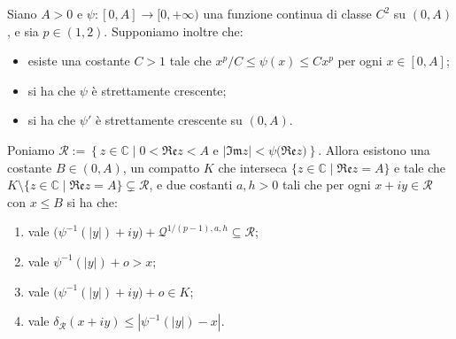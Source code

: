 \begin{lm} \label{psierre}
    Siano $A>0$ e $\psi:[0,A]\longrightarrow[0,+\infty)$ una funzione continua di classe $C^2$ su $(0,A)$, e sia $p\in(1,2)$. Supponiamo inoltre che:
    \begin{itemize}
        \item esiste una costante $C>1$ tale che $x^p/C\le\psi(x)\le Cx^p$ per ogni $x\in[0,A]$;
        \item si ha che $\psi$ è strettamente crescente;
        \item si ha che $\psi'$ è strettamente crescente su $(0,A)$.
    \end{itemize}

    Poniamo $\mathcal{R}:=\left\{z\in\mathbb{C}\mid 0<\mathfrak{Re}z<A\text{ e }|\mathfrak{Im}z|<\psi\bigl(\mathfrak{Re}z\bigr)\right\}$. Allora esistono una costante $B\in(0,A)$, un compatto $K$ che interseca $\{z\in\mathbb{C}\mid\mathfrak{Re}z=A\}$ e tale che $K\setminus\{z\in\mathbb{C}\mid\mathfrak{Re}z=A\}\subsetneq\mathcal{R}$, e due costanti $a,h>0$ tali che per ogni $x+iy\in\mathcal{R}$ con $x\le B$ si ha che:
    \begin{enumerate}[label={(\arabic*)}]
        \item vale $\bigl(\psi^{-1}(|y|)+iy\bigr)+\mathcal{Q}^{1/(p-1),a,h}\subseteq\mathcal{R}$;
        \item vale $\psi^{-1}(|y|)+o>x$;
        \item vale $\bigl(\psi^{-1}(|y|)+iy\bigr)+o\in K$;
        \item vale $\delta_{\mathcal{R}}(x+iy) \le |\psi^{-1}(|y|)-x|$.
    \end{enumerate}
\end{lm}

